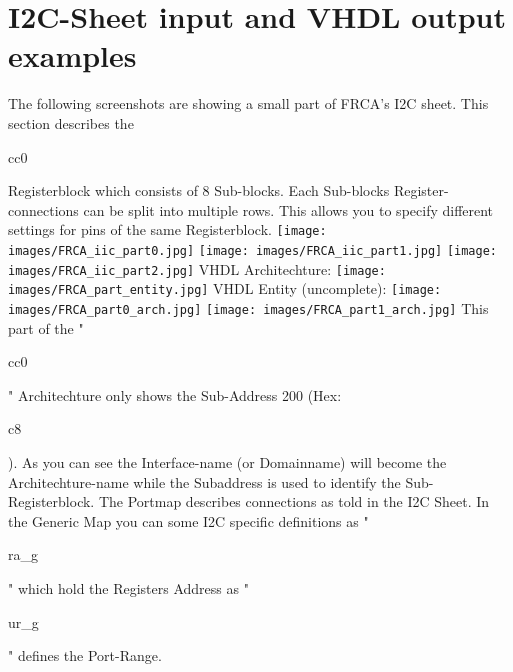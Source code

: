 \documentclass[a4paper,12pt]{report}
\begin{document}
\section{I2C-Sheet input and VHDL output examples}
The following screenshots are showing a small part of  FRCA's I2C sheet. This section describes the \begin{tt}cc0\end{tt} Registerblock which consists of 8 Sub-blocks. Each Sub-blocks Register-connections can be split into multiple rows. This allows you to specify different settings for pins of the same Registerblock.\newline
\newline
\texttt{[image: images/FRCA\_iic\_part0.jpg]}\newline
\newline
\texttt{[image: images/FRCA\_iic\_part1.jpg]}\newline
\newline
\texttt{[image: images/FRCA\_iic\_part2.jpg]}\newline
\newpage
VHDL Architechture:\newline
\texttt{[image: images/FRCA\_part\_entity.jpg]}\newline
\newpage
VHDL Entity (uncomplete):\newline
\texttt{[image: images/FRCA\_part0\_arch.jpg]}\newline
\newline
\texttt{[image: images/FRCA\_part1\_arch.jpg]}\newline
This part of the "\begin{tt}cc0\end{tt}" Architechture only shows the Sub-Address 200 (Hex: \begin{tt}c8\end{tt}). As you can see the Interface-name (or Domainname) will become the Architechture-name while the Subaddress is used to identify the Sub-Registerblock. The Portmap describes connections as told in the I2C Sheet. In the Generic Map you can some I2C specific definitions as "\begin{tt}ra\_g\end{tt}" which hold the Registers Address as "\begin{tt}ur\_g\end{tt}" defines the Port-Range.\newline
\end{document}
